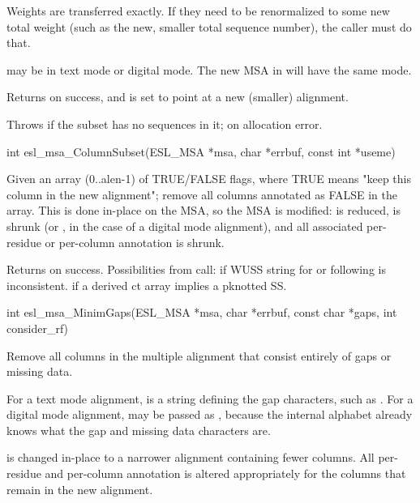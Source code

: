 \begin{sreapi}
Weights are transferred exactly. If they need to be
renormalized to some new total weight (such as the new,
smaller total sequence number), the caller must do that.

 may be in text mode or digital mode. The new MSA
in  will have the same mode.

Returns  on success, and  is set to point at a new
(smaller) alignment.

Throws  if the subset has no sequences in it;
 on allocation error.



\hypertarget{func:esl_msa_ColumnSubset()}
{\item[int esl\_msa\_ColumnSubset(ESL\_MSA *msa, char *errbuf, const int *useme)]}

Given an array  (0..alen-1) of TRUE/FALSE flags,
where TRUE means "keep this column in the new alignment"; 
remove all columns annotated as FALSE in the  
array. This is done in-place on the MSA, so the MSA is 
modified:  is reduced,  is shrunk 
(or , in the case of a digital mode alignment), 
and all associated per-residue or per-column annotation
is shrunk.

Returns  on success.
Possibilities from  call:
 if WUSS string for  or 
following  is inconsistent.
 if a derived ct array implies a pknotted SS.


\hypertarget{func:esl_msa_MinimGaps()}
{\item[int esl\_msa\_MinimGaps(ESL\_MSA *msa, char *errbuf, const char *gaps, int consider\_rf)]}

Remove all columns in the multiple alignment 
that consist entirely of gaps or missing data.

For a text mode alignment,  is a string defining
the gap characters, such as . For a digital mode
alignment,  may be passed as , because the
internal alphabet already knows what the gap and missing
data characters are.

 is changed in-place to a narrower alignment
containing fewer columns. All per-residue and per-column
annotation is altered appropriately for the columns that
remain in the new alignment.


\end{sreapi}

